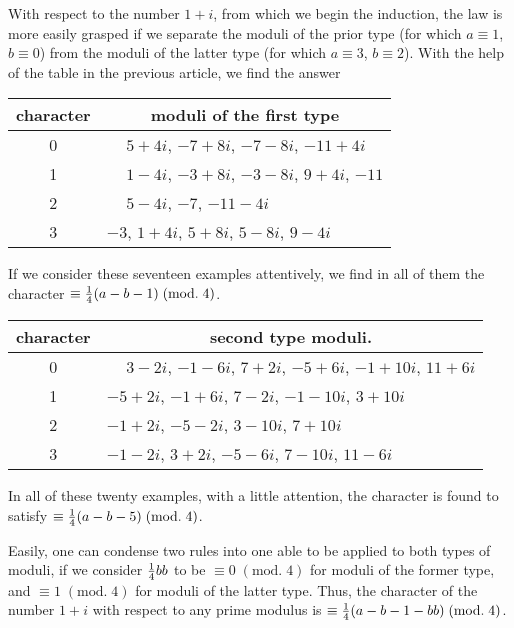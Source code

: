 \documentclass[twoside,12pt, showframe]{memoir}
\renewcommand{\pmod}[1]{\;(\textrm{mod.}\;#1)}
\let\oldfrac\frac
\def\frac#1#2{\mathchoice{\tfrac{#1}{#2}}{\oldfrac{#1}{#2}}{\genfrac{}{}{}{2}{#1}{#2\mathstrut}}{\genfrac{}{}{}{3}{#1}{#2\mathstrut}}}
\begin{document}
With respect to the number \(1+i\), from which we begin the induction, the law is more easily grasped if we separate the moduli of the prior type (for which \(a \equiv 1\), \( b \equiv 0\)) from the moduli of the latter type (for which \(a \equiv 3\), \( b \equiv 2\)). With the help of the table in the previous article, we find the answer\clearpage\noindent\begin{center}
\begin{tabular}{c|l}
character & \multicolumn{1}{c}{moduli of the first type} \\
\hline
0 & \(\phantom{+}5+4 i\), \(-7+8 i\), \(-7-8 i\), \(-11+4 i\) \\
1 & \(\phantom{+}1-4 i\), \(-3+8 i\), \(-3-8 i\), \( 9+4i\), \(-11\) \\
2 & \(\phantom{+}5-4 i\), \(-7\), \(-11-4 i\) \\
3 & \(-3\), \(1+4 i\), \( 5+8 i\), \( 5-8 i\), \( 9-4 i\) \\
\end{tabular}
\end{center}
If we consider these seventeen examples attentively, we find in all of them the character \(\equiv \frac{1}{4}(a-b-1)\pmod{4}\).
%

\begin{center}
\begin{tabular}{c|l}
character & \multicolumn{1}{c}{second type moduli.} \\
\hline
0 & \(\phantom{+}3-2 i\), \(-1-6 i\), \( 7+2 i\), \(-5+6 i\), \(-1+10 i\), \( 11+6 i\) \\
1 & \(-5+2 i\), \(-1+6 i\), \( 7-2 i\), \(-1-10 i\), \( 3+10 i\) \\
2 & \(-1+2 i\), \(-5-2 i\), \( 3-10 i\), \( 7+10 i\) \\
3 & \(-1-2 i\), \( 3+2 i\), \(-5-6 i\), \( 7-10 i\), \( 11-6 i\) \\
\end{tabular}
\end{center}

In all of these twenty examples, with a little attention, the character is found to satisfy \(\equiv \frac{1}{4}(a-b-5)\pmod{4}\).
%

Easily, one can condense two rules into one able to be applied to both types of moduli, if we consider \(\frac{1}{4} b b\) to be \( \equiv 0\pmod{4}\) for moduli of the former type, and \( \equiv 1\pmod{4}\) for moduli of the latter type. Thus, the character of the number \(1+i\) with respect to any prime modulus is \(\equiv \frac{1}{4}(a-b-1-b b)\pmod{4}\).
\end{document}
